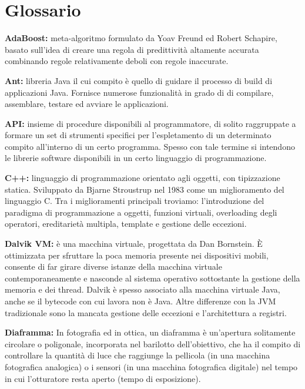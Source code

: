 \newpage
\newpage
\chapter{Glossario} %
\label{AppendixA} %


\textbf{AdaBoost:} meta-algoritmo formulato da Yoav Freund ed Robert Schapire, basato sull'idea di creare una regola di predittività altamente accurata combinando regole relativamente deboli con regole inaccurate.

\textbf{Ant:} libreria Java il cui compito è quello di guidare il processo di build di applicazioni Java. Fornisce numerose funzionalità in grado di di compilare, assemblare, testare ed avviare le applicazioni.

\textbf{API:} insieme di procedure disponibili al programmatore, di solito raggruppate a formare un set di strumenti specifici per l'espletamento di un determinato compito all'interno di un certo programma. Spesso con tale termine si intendono le librerie software disponibili in un certo linguaggio di programmazione.

\textbf{C++:} linguaggio di programmazione orientato agli oggetti, con tipizzazione statica. Sviluppato da Bjarne Stroustrup nel 1983 come un miglioramento del linguaggio C. Tra i miglioramenti principali troviamo: l'introduzione del paradigma di programmazione a oggetti, funzioni virtuali, overloading degli operatori, ereditarietà multipla, template e gestione delle eccezioni.

\textbf{Dalvik VM:} è una macchina virtuale, progettata da Dan Bornstein. È ottimizzata per sfruttare la poca memoria presente nei dispositivi mobili, consente di far girare diverse istanze della macchina virtuale contemporaneamente e nasconde al sistema operativo sottostante la gestione della memoria e dei thread. Dalvik è spesso associato alla macchina virtuale Java, anche se il bytecode con cui lavora non è Java. Altre differenze con la JVM tradizionale sono la mancata gestione delle eccezioni e l'architettura a registri.

\textbf{Diaframma:} In fotografia ed in ottica, un diaframma è un'apertura solitamente circolare o poligonale, incorporata nel barilotto dell'obiettivo, che ha il compito di controllare la quantità di luce che raggiunge la pellicola (in una macchina fotografica analogica) o i sensori (in una macchina fotografica digitale) nel tempo in cui l'otturatore resta aperto (tempo di esposizione).


